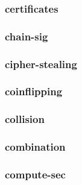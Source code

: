 \begin{frame}\frametitle{certificates}
\begin{figure}
\begin{center}

\end{center}
\end{figure}
\end{frame}
\begin{frame}\frametitle{chain-sig}
\begin{figure}
\begin{center}

\end{center}
\end{figure}
\end{frame}
\begin{frame}\frametitle{cipher-stealing}
\begin{figure}
\begin{center}

\end{center}
\end{figure}
\end{frame}
\begin{frame}\frametitle{coinflipping}
\begin{figure}
\begin{center}

\end{center}
\end{figure}
\end{frame}
\begin{frame}\frametitle{collision}
\begin{figure}
\begin{center}

\end{center}
\end{figure}
\end{frame}
\begin{frame}\frametitle{combination}
\begin{figure}
\begin{center}

\end{center}
\end{figure}
\end{frame}
\begin{frame}\frametitle{compute-sec}
\begin{figure}
\begin{center}

\end{center}
\end{figure}
\end{frame}
